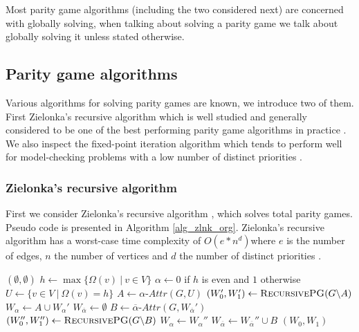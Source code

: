 Most parity game algorithms (including the two considered next) are concerned with globally solving, when talking about solving a parity game we talk about globally solving it unless stated otherwise. 

\subsection{Parity game algorithms}
Various algorithms for solving parity games are known, we introduce two of them. First Zielonka's recursive algorithm which is well studied and generally considered to be one of the best performing parity game algorithms in practice \cite{Oink,SolvingPGInPractice}. We also inspect the fixed-point iteration algorithm which tends to perform well for model-checking problems with a low number of distinct priorities \cite{BDDSolvingPG}.

\subsubsection{Zielonka's recursive algorithm}
First we consider Zielonka's recursive algorithm \cite{ZIELONKA1998135,MCNAUGHTON1993149}, which solves total parity games. Pseudo code is presented in Algorithm \ref{alg_zlnk_org}. Zielonka's recursive algorithm has a worst-case time complexity of $O(e*n^d)$where $e$ is the number of edges, $n$ the number of vertices and $d$ the number of distinct priorities \cite{friedmanPG}.
\begin{algorithm}
	\caption{$\textsc{RecursivePG}(\textit{PG } G = (V,V_0,V_1, E, \Omega))$}
	\label{alg_zlnk_org}
	\begin{algorithmic}[1]
		\State \Return $(\emptyset, \emptyset)$
		\EndIf
		\State $h \gets\max\{ \Omega(v)\ |\ v \in V\}$
		\State $\alpha \gets 0$ if $h$ is even and $1$ otherwise
		\State $U \gets \{v \in V\ |\ \Omega(v) = h\}$
		\State $A \gets \alpha\textit{-Attr}(G, U)$
		\State $(W_0', W_1') \gets \textsc{RecursivePG}(G \backslash A)$
		\State $W_\alpha \gets A \cup W_\alpha'$
		\State $W_{\overline{\alpha}} \gets \emptyset$
		\Else
		\State $B \gets \overline{\alpha}\textit{-Attr}(G,W_{\overline{\alpha}}')$
		\State $(W_0'', W_1'') \gets \textsc{RecursivePG}(G \backslash B)$
		\State $W_\alpha \gets W_\alpha''$
		\State $W_{\overline{\alpha}} \gets W_{\overline{\alpha}}'' \cup B$
		\EndIf
		\State \Return $(W_0, W_1)$
	\end{algorithmic}
\end{algorithm}

